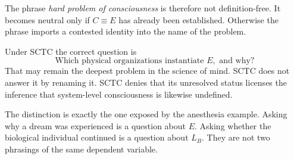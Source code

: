 The phrase \emph{hard problem of consciousness} is therefore not definition-free. It becomes neutral only if $C\equiv E$ has already been established. Otherwise the phrase imports a contested identity into the name of the problem.

Under SCTC the correct question is
\begin{equation}
\boxed{\text{Which physical organizations instantiate }E,\text{ and why?}}
\end{equation}
That may remain the deepest problem in the science of mind. SCTC does not answer it by renaming it. SCTC denies that its unresolved status licenses the inference that system-level consciousness is likewise undefined.

The distinction is exactly the one exposed by the anesthesia example. Asking why a dream was experienced is a question about $E$. Asking whether the biological individual continued is a question about $L_B$. They are not two phrasings of the same dependent variable.

